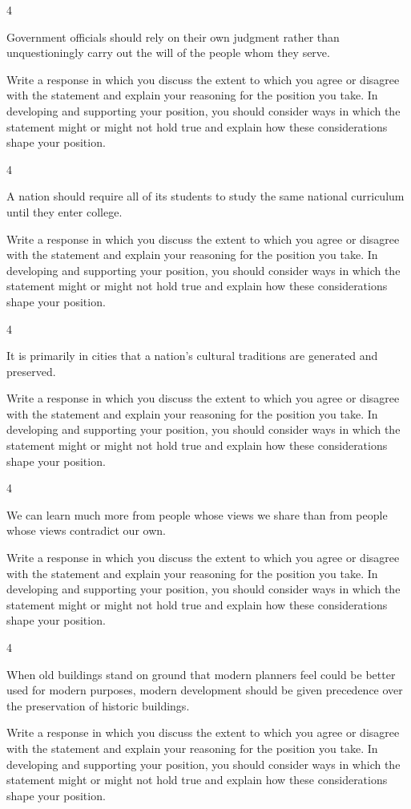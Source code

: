 \documentclass[]{article}
\begin{document}
4

Government officials should rely on their own judgment rather than
unquestioningly carry out the will of the people whom they serve.

Write a response in which you discuss the extent to which you agree or
disagree with the statement and explain your reasoning for the position
you take. In developing and supporting your position, you should
consider ways in which the statement might or might not hold true and
explain how these considerations shape your position.

4

A nation should require all of its students to study the same national
curriculum until they enter college.

Write a response in which you discuss the extent to which you agree or
disagree with the statement and explain your reasoning for the position
you take. In developing and supporting your position, you should
consider ways in which the statement might or might not hold true and
explain how these considerations shape your position.

4

It is primarily in cities that a nation's cultural traditions are
generated and preserved.

Write a response in which you discuss the extent to which you agree or
disagree with the statement and explain your reasoning for the position
you take. In developing and supporting your position, you should
consider ways in which the statement might or might not hold true and
explain how these considerations shape your position.

4

We can learn much more from people whose views we share than from people
whose views contradict our own.

Write a response in which you discuss the extent to which you agree or
disagree with the statement and explain your reasoning for the position
you take. In developing and supporting your position, you should
consider ways in which the statement might or might not hold true and
explain how these considerations shape your position.

4

When old buildings stand on ground that modern planners feel could be
better used for modern purposes, modern development should be given
precedence over the preservation of historic buildings.

Write a response in which you discuss the extent to which you agree or
disagree with the statement and explain your reasoning for the position
you take. In developing and supporting your position, you should
consider ways in which the statement might or might not hold true and
explain how these considerations shape your position.
\end{document}
